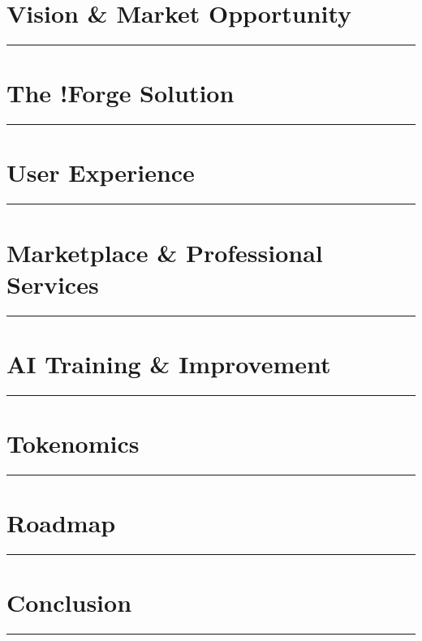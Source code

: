 \documentclass[11pt,a4paper]{article}
\newcommand{\fabSectionrule}{
    \vspace{-1ex}
    \noindent\textcolor{fabAccent}{\rule{\linewidth}{2pt}}
    \vspace{1ex}
}
\begin{document}
\clearpage
\section{Vision \& Market Opportunity}
\fabSectionrule


\clearpage
\section{The !Forge Solution}
\fabSectionrule


\clearpage
\section{User Experience}
\fabSectionrule


\clearpage
\section{Marketplace \& Professional Services}
\fabSectionrule


\clearpage
\section{AI Training \& Improvement}
\fabSectionrule


\clearpage
\section{Tokenomics}
\fabSectionrule


\clearpage
\section{Roadmap}
\fabSectionrule


\clearpage
\section{Conclusion}
\fabSectionrule

\end{document}
